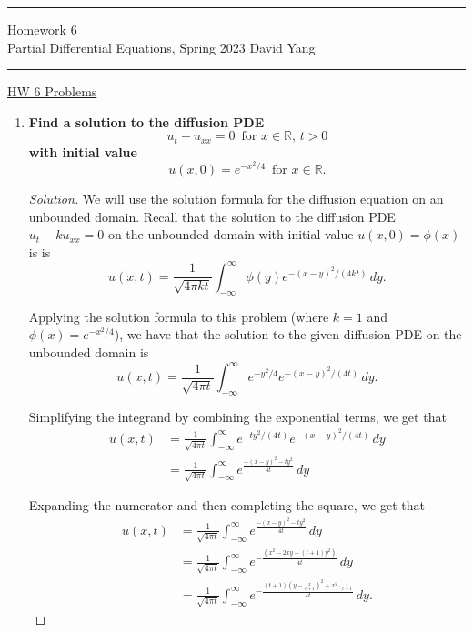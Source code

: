 \documentclass[11pt]{article}
\newenvironment{solution}
  {\renewcommand\qedsymbol{$\blacksquare$}\begin{proof}[Solution]}
  {\end{proof}}
\begin{document}
	\hrule
	\begin{center}
		{\Large Homework 6} \\ %
		\vspace{0.2cm}
		Partial Differential Equations, Spring 2023 \hfill David Yang %
	\end{center}

\hrule

\vspace{1em}

\underline{HW 6 Problems} 
\begin{enumerate}
\item \textbf{Find a solution to the diffusion PDE} \[ u_t - u_{xx} = 0 \, \, \, \text{for } x \in \mathbb{R}, \, t > 0\] \textbf{with initial value} 
\[ u(x, 0) = e^{-x^2/4} \, \, \, \text{for } x \in \mathbb{R}.\]

\begin{solution}
We will use the solution formula for the diffusion equation on an unbounded domain. Recall that the solution to the diffusion PDE $u_t - ku_{xx} = 0$ on the unbounded domain with initial value $u(x, 0) = \phi(x)$ is
is \[ u(x, t) = \frac{1}{\sqrt{4\pi k t}} \int_{-\infty}^{\infty} \phi(y) e^{-(x-y)^2/(4kt)} \, dy.\]

Applying the solution formula to this problem (where $k=1$ and $\phi(x) = e^{-x^2/4}$), we have that the solution to the given diffusion PDE on the unbounded domain is
\[ u(x, t) = \frac{1}{\sqrt{4\pi t}} \int_{-\infty}^{\infty} e^{-y^2/4} e^{-(x-y)^2/(4t)} \, dy.\]

Simplifying the integrand by combining the exponential terms, we get that
\begin{align*}u(x, t) &= \frac{1}{\sqrt{4\pi t}} \int_{-\infty}^{\infty} e^{-ty^2/(4t)} e^{-(x-y)^2/(4t)} \, dy \\
&= \frac{1}{\sqrt{4\pi t}} \int_{-\infty}^{\infty} e^{\frac{-(x-y)^2-ty^2}{4t}}\, dy\end{align*}

Expanding the numerator and then completing the square, we get that
\begin{align*}u(x, t) &= \frac{1}{\sqrt{4\pi t}} \int_{-\infty}^{\infty} e^{\frac{-(x-y)^2-ty^2}{4t}} \, dy \\
	&= \frac{1}{\sqrt{4\pi t}} \int_{-\infty}^{\infty} e^{-\frac{(x^2-2xy+(t+1)y^2)}{4t}}\, dy \\
	&= \frac{1}{\sqrt{4\pi t}} \int_{-\infty}^{\infty} e^{-\frac{(t+1)\left(y-\frac{x}{t+1}\right)^2 + x^2 \cdot \frac{t}{t+1}}{4t}}\, dy.\end{align*}


\end{solution}
\end{enumerate}
\end{document}
